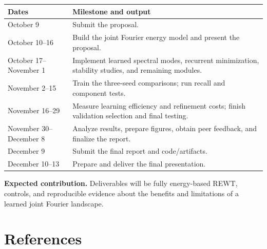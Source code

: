 \documentclass[11pt,letterpaper]{article}
\begin{document}
\smallskip\begin{tabularx}{\textwidth}{@{}p{3.2cm}X@{}}\toprule
\textbf{Dates} & \textbf{Milestone and output}\\\midrule
October 9 & Submit the proposal.\\
October 10–16 & Build the joint Fourier energy model and present the proposal.\\
October 17–November 1 & Implement learned spectral modes, recurrent minimization, stability studies, and remaining modules.\\
November 2–15 & Train the three-seed comparisons; run recall and component tests.\\
November 16–29 & Measure learning efficiency and refinement costs; finish validation selection and final testing.\\
November 30–December 8 & Analyze results, prepare figures, obtain peer feedback, and finalize the report.\\
December 9 & Submit the final report and code/artifacts.\\
December 10–13 & Prepare and deliver the final presentation.\\
\bottomrule\end{tabularx}\smallskip

\textbf{Expected contribution.} Deliverables will be fully energy-based REWT, controls, and reproducible evidence about the benefits and limitations of a learned joint Fourier landscape.

\newpage
\section*{References}
\end{document}
